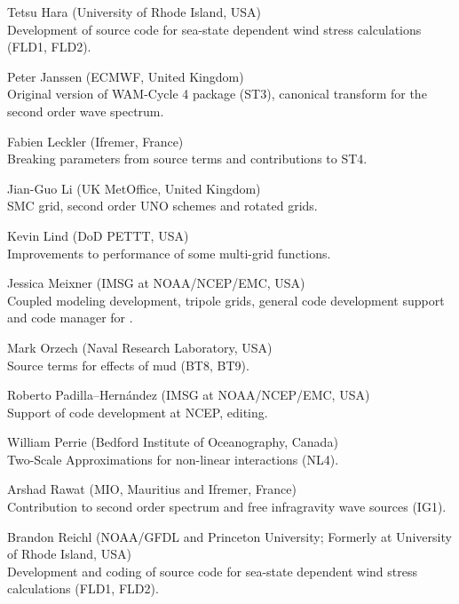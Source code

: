 \begin{list}{\ldots}{ }
\item [Tetsu Hara] (University of Rhode Island, USA) \\
  Development of source code for sea-state dependent wind stress calculations (FLD1, FLD2).

\item [Peter Janssen] (ECMWF, United Kingdom) \\
  Original version of WAM-Cycle 4 package (ST3), canonical transform for the second order wave spectrum.

\item [Fabien Leckler] (Ifremer, France) \\
  Breaking parameters from source terms and contributions to ST4.

\item [Jian-Guo Li] (UK MetOffice, United Kingdom) \\
  SMC grid, second order UNO schemes and rotated grids.

\item [Kevin Lind]  (DoD PETTT, USA)\\ 
  Improvements to performance of some multi-grid functions.

\item [Jessica Meixner] (IMSG at NOAA/NCEP/EMC, USA) \\
  Coupled modeling development, tripole grids, general code development support  and code manager for \ws.
 
\item [Mark Orzech]  (Naval Research Laboratory, USA)\\ 
  Source terms for effects of mud (BT8, BT9).

\item [Roberto Padilla--Hern\'andez]  (IMSG at NOAA/NCEP/EMC, USA)\\ 
  Support of code development at NCEP, editing.

\item [William Perrie] (Bedford Institute of Oceanography, Canada)\\
 Two-Scale Approximations for non-linear interactions (NL4).

\item [Arshad Rawat] (MIO, Mauritius and Ifremer, France) \\
  Contribution to second order spectrum and free infragravity wave sources (IG1).    

\item [Brandon Reichl] (NOAA/GFDL and Princeton University; Formerly at University of Rhode Island, USA) \\
  Development and coding of source code for sea-state dependent wind stress calculations (FLD1, FLD2).


\end{list}
